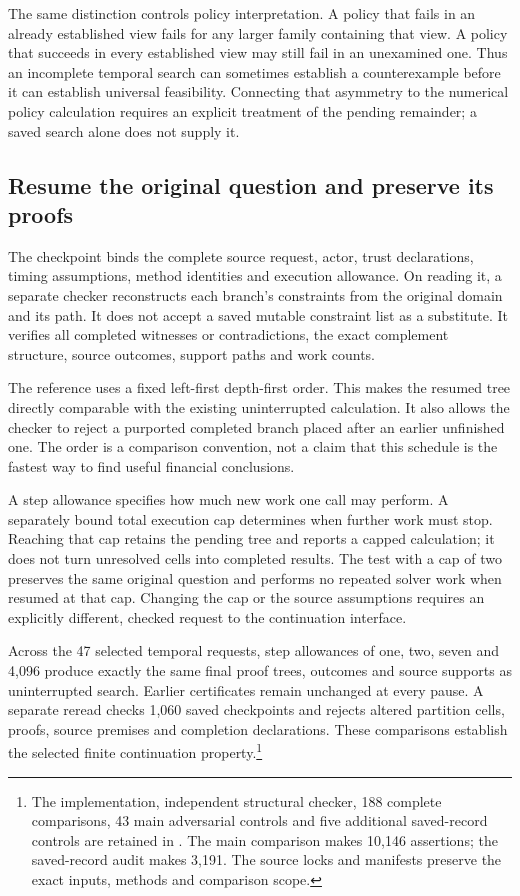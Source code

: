 The same distinction controls policy interpretation. A policy that fails in an already established view fails for any larger family containing that view. A policy that succeeds in every established view may still fail in an unexamined one. Thus an incomplete temporal search can sometimes establish a counterexample before it can establish universal feasibility. Connecting that asymmetry to the numerical policy calculation requires an explicit treatment of the pending remainder; a saved search alone does not supply it.

\subsection{Resume the original question and preserve its proofs}

The checkpoint binds the complete source request, actor, trust declarations, timing assumptions, method identities and execution allowance. On reading it, a separate checker reconstructs each branch's constraints from the original domain and its path. It does not accept a saved mutable constraint list as a substitute. It verifies all completed witnesses or contradictions, the exact complement structure, source outcomes, support paths and work counts.

The reference uses a fixed left-first depth-first order. This makes the resumed tree directly comparable with the existing uninterrupted calculation. It also allows the checker to reject a purported completed branch placed after an earlier unfinished one. The order is a comparison convention, not a claim that this schedule is the fastest way to find useful financial conclusions.

A step allowance specifies how much new work one call may perform. A separately bound total execution cap determines when further work must stop. Reaching that cap retains the pending tree and reports a capped calculation; it does not turn unresolved cells into completed results. The test with a cap of two preserves the same original question and performs no repeated solver work when resumed at that cap. Changing the cap or the source assumptions requires an explicitly different, checked request to the continuation interface.

Across the 47 selected temporal requests, step allowances of one, two, seven and 4,096 produce exactly the same final proof trees, outcomes and source supports as uninterrupted search. Earlier certificates remain unchanged at every pause. A separate reread checks 1,060 saved checkpoints and rejects altered partition cells, proofs, source premises and completion declarations. These comparisons establish the selected finite continuation property.\footnote{The implementation, independent structural checker, 188 complete comparisons, 43 main adversarial controls and five additional saved-record controls are retained in . The main comparison makes 10,146 assertions; the saved-record audit makes 3,191. The source locks and manifests preserve the exact inputs, methods and comparison scope.}

